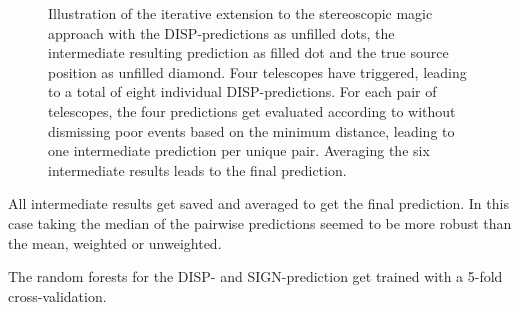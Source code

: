 \begin{figure}
\begin{subfigure}{0.45\textwidth}
    \end{subfigure}
    \caption{
    Illustration of the iterative extension to the stereoscopic magic approach
    with the DISP-predictions as unfilled dots, the intermediate resulting prediction
    as filled dot and the true source position as unfilled diamond.
    Four telescopes have triggered, leading to a total of eight individual DISP-predictions.
    For each pair of telescopes, the four predictions get evaluated according to \cite{ALEKSIC201676}
    without dismissing poor events based on the minimum distance, leading to one 
    intermediate prediction per unique pair.
    Averaging the six intermediate results leads to the final prediction.}
    \label{fig:stereo_disp}
\end{figure}

All intermediate results get saved and averaged to get the final prediction.
In this case taking the median of the pairwise predictions seemed to be more robust
than the mean, weighted or unweighted.

The random forests for the DISP- and SIGN-prediction get trained with a 5-fold cross-validation.

